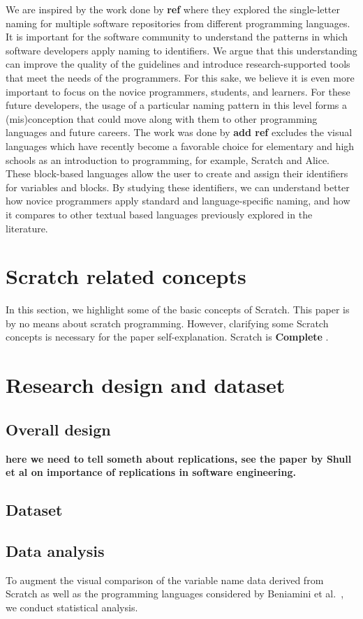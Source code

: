\documentclass[conference]{IEEEtran}
\newcommand{\todo}[1]{ \textbf{#1} }
\begin{document}
We are inspired by the work done by \todo{ref} where they explored the single-letter naming for multiple software repositories from different programming languages. It is important for the software community to understand the patterns in which software developers apply naming to identifiers. We argue that this understanding can improve the quality of the guidelines and introduce research-supported tools that meet the needs of the programmers. For this sake, we believe it is even more important to focus on the novice programmers, students, and learners. For these future developers, the usage of a particular naming pattern in this level forms a (mis)conception that could move along with them to other programming languages and future careers. The work was done by \todo{add ref} excludes the visual languages which have recently become a favorable choice for elementary and high schools as an introduction to programming, for example, Scratch and Alice. These block-based languages allow the user to create and assign their identifiers for variables and blocks. By studying these identifiers, we can understand better how novice programmers apply standard and language-specific naming, and how it compares to other textual based languages previously explored in the literature. 

\section{Scratch related concepts}
In this section, we highlight some of the basic concepts of Scratch. This paper is by no means about scratch programming. However, clarifying some Scratch concepts is necessary for the paper self-explanation. Scratch is \todo{Complete}. 

\section{Research design and dataset}
\subsection{Overall design}
\todo{here we need to tell someth about replications, see the paper by Shull et al on importance of replications in software engineering.}
\subsection{Dataset}
\subsection{Data analysis}
To augment the visual comparison of the variable name data derived from Scratch as well as the programming languages considered by Beniamini et al.~\cite{Beniamini}, we conduct statistical analysis. 
\end{document}
